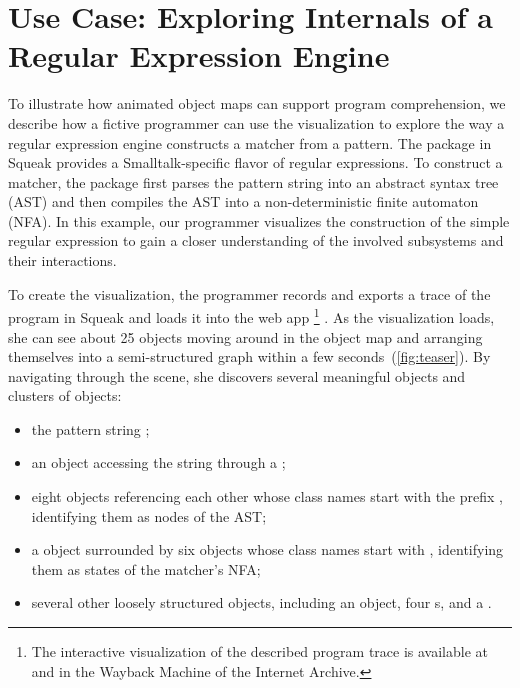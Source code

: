 \section{Use Case: Exploring Internals of a Regular Expression Engine}
\label{sec:use_case}

To illustrate how animated object maps can support program comprehension, we describe how a fictive programmer can use the \tfd{} visualization to explore the way a regular expression engine constructs a matcher from a pattern.
The  package in Squeak provides a Smalltalk-specific flavor of regular expressions.
To construct a matcher, the package first parses the pattern string into an abstract syntax tree (AST) and then compiles the AST into a non-deterministic finite automaton (NFA).
In this example, our programmer visualizes the construction of the simple regular expression  to gain a closer understanding of the involved subsystems and their interactions.

To create the visualization, the programmer records and exports a trace of the program  in Squeak and loads it into the \tfd{} web app%
\footnote{The interactive visualization of the described program trace is available at  and in the Wayback Machine of the Internet Archive.}%
.
As the visualization loads, she can see about 25 objects moving around in the object map and arranging themselves into a semi-structured graph within a few seconds~(\cref{fig:teaser}).
By navigating through the scene, she discovers several meaningful objects and clusters of objects:

\begin{itemize}
	\item the pattern string ;
	\item an  object accessing the string through a ;
	\item eight objects referencing each other whose class names start with the prefix , identifying them as nodes of the AST;
	\item a  object surrounded by six objects whose class names start with , identifying them as states of the matcher's NFA;
	\item several other loosely structured objects, including an  object, four s, and a .
\end{itemize}

